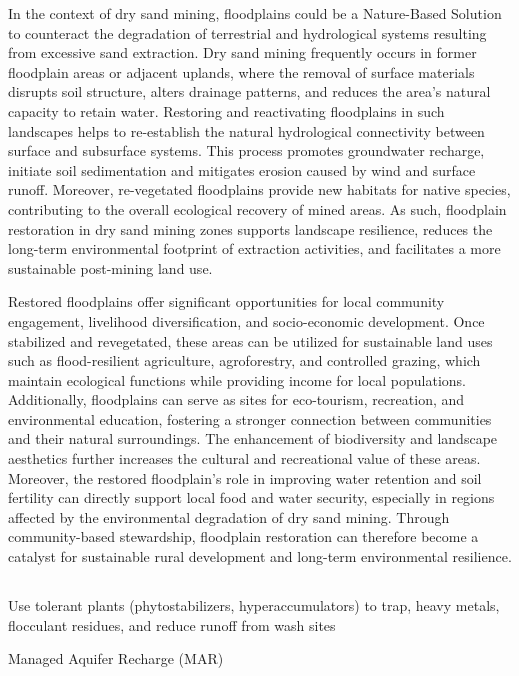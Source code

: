 In the context of dry sand mining, floodplains could be a Nature-Based Solution to counteract the degradation of terrestrial and hydrological systems resulting from excessive sand extraction. Dry sand mining frequently occurs in former floodplain areas or adjacent uplands, where the removal of surface materials disrupts soil structure, alters drainage patterns, and reduces the area’s natural capacity to retain water. Restoring and reactivating floodplains in such landscapes helps to re-establish the natural hydrological connectivity between surface and subsurface systems. This process promotes groundwater recharge, initiate soil sedimentation and mitigates erosion caused by wind and surface runoff. Moreover, re-vegetated floodplains provide new habitats for native species, contributing to the overall ecological recovery of mined areas. As such, floodplain restoration in dry sand mining zones supports landscape resilience, reduces the long-term environmental footprint of extraction activities, and facilitates a more sustainable post-mining land use.

Restored floodplains offer significant opportunities for local community engagement, livelihood diversification, and socio-economic development. Once stabilized and revegetated, these areas can be utilized for sustainable land uses such as flood-resilient agriculture, agroforestry, and controlled grazing, which maintain ecological functions while providing income for local populations. Additionally, floodplains can serve as sites for eco-tourism, recreation, and environmental education, fostering a stronger connection between communities and their natural surroundings. The enhancement of biodiversity and landscape aesthetics further increases the cultural and recreational value of these areas. Moreover, the restored floodplain’s role in improving water retention and soil fertility can directly support local food and water security, especially in regions affected by the environmental degradation of dry sand mining. Through community-based stewardship, floodplain restoration can therefore become a catalyst for sustainable rural development and long-term environmental resilience.

\subsection{}
Use tolerant plants (phytostabilizers, hyperaccumulators) to trap, heavy metals, flocculant residues, and reduce runoff from wash sites

Managed Aquifer Recharge (MAR)

